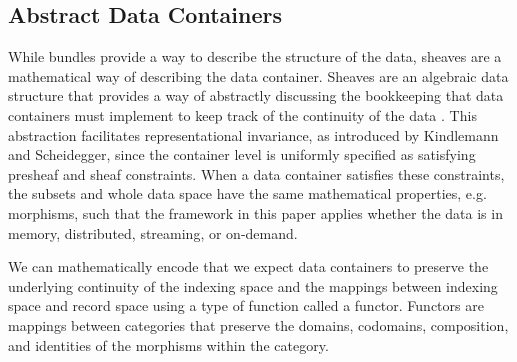 \documentclass[review]{vgtc}
\theoremstyle{definition}
\theoremstyle{remark}
\begin{document}
\subsection{Abstract Data Containers}
\label{sec:atct:sheaves}
While bundles provide a way to describe the structure of the data, sheaves are a mathematical way of describing the data container. Sheaves are an algebraic data structure that provides a way of abstractly discussing the bookkeeping that data containers must implement to keep track of the continuity of the data \cite{ghristElementaryAppliedTopology2014}. This abstraction facilitates representational invariance, as introduced by Kindlemann and Scheidegger\cite{kindlmannAlgebraicProcessVisualization2014}, since the container level is uniformly specified as satisfying presheaf and sheaf constraints. When a data container satisfies these constraints, the subsets and whole data space have the same mathematical properties, e.g. morphisms, such that the framework in this paper applies whether the data is in memory, distributed, streaming, or on-demand.

We can mathematically encode that we expect data containers to preserve the underlying continuity of the indexing space and the mappings between indexing space and record space using a type of function called a functor. Functors are mappings between categories that preserve the domains, codomains, composition, and identities of the morphisms within the category\cite{riehlCategoryTheoryContext}.
\end{document}
